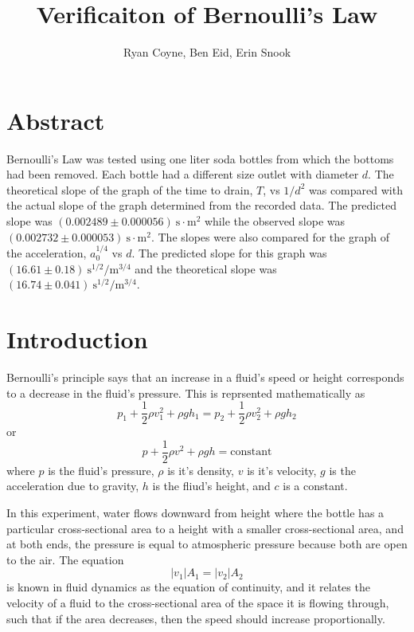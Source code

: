\documentclass[12pt]{article}
\begin{document}
    \title{Verificaiton of Bernoulli's Law}
    \author{Ryan Coyne, Ben Eid, Erin Snook}
    \maketitle

    \section{Abstract}
        Bernoulli's Law was tested using one liter soda bottles from which the bottoms had been removed. Each bottle had a different size outlet with diameter \(d\). The theoretical slope of the graph of the time to drain, \(T\), vs \(1/d^{2}\) was compared with the actual slope of the graph determined from the recorded data. The predicted slope was \((0.002489 \pm 0.000056) \mathrm{~s \cdot m^2}\) while the observed slope was \((0.002732 \pm 0.000053) \mathrm{~s \cdot m^2}\). The slopes were also compared for the graph of the acceleration, \(a_0^{1/4}\) vs \(d\). The predicted slope for this graph was \((16.61 \pm 0.18) \mathrm{~s^{1/2}/m^{3/4}}\) and the theoretical slope was \((16.74 \pm 0.041)\mathrm{~s^{1/2}/m^{3/4}}\).
    \section{Introduction}
        Bernoulli's principle says that an increase in a fluid's speed or height corresponds to a decrease in the fluid's pressure. This is reprsented mathematically as 
        \begin{equation*}
            p_1 + \frac{1}{2} \rho v_1^2 + \rho g h_1 = p_2 + \frac{1}{2} \rho v_2^2 + \rho g h_2
        \end{equation*}
        or
        \begin{equation*}
            p + \frac{1}{2} \rho v^2 + \rho g h = \text{constant}
        \end{equation*}
        where \(p\) is the fluid's pressure, \(\rho\) is it's density, \(v\) is it's velocity, \(g\) is the acceleration due to gravity, \(h\) is the fliud's height, and \(c\) is a constant.

        In this experiment, water flows downward from height where the bottle has a particular cross-sectional area to a height with a smaller cross-sectional area, and at both ends, the pressure is equal to atmospheric pressure because both are open to the air. The equation
        \begin{equation*}
            |v_1|A_1 = |v_2|A_2
        \end{equation*}
        is known in fluid dynamics as the equation of continuity, and it relates the velocity of a fluid to the cross-sectional area of the space it is flowing through, such that if the area decreases, then the speed should increase proportionally. 
\end{document}
